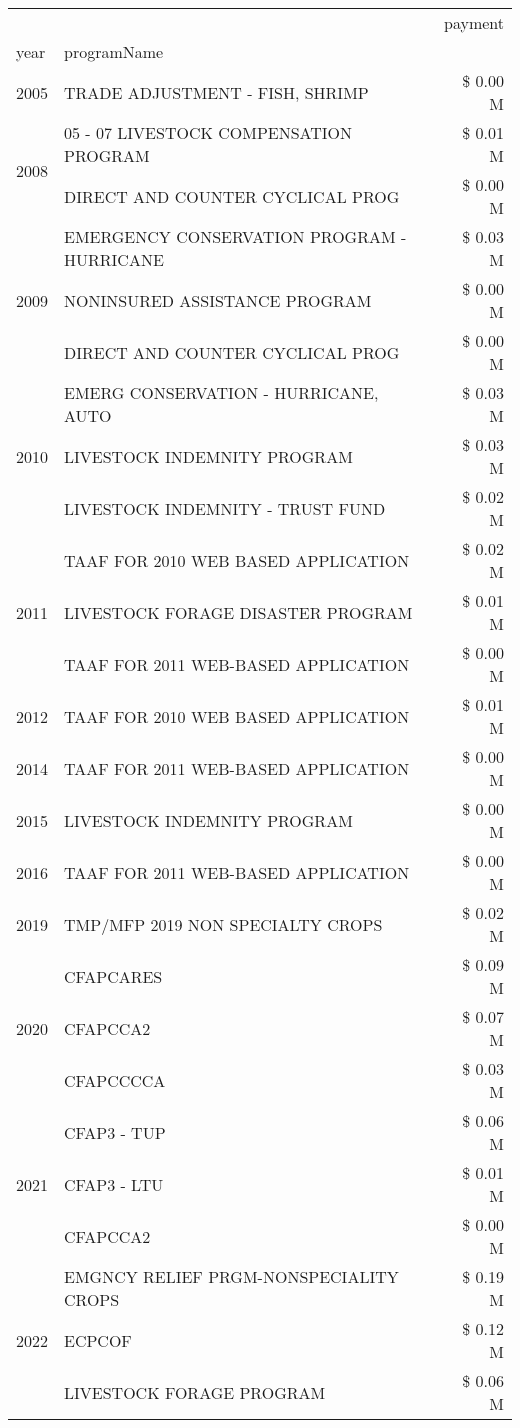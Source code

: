 \begin{tabular}{llr}
\toprule
 &  & payment \\
year & programName &  \\
\midrule
2005 & TRADE ADJUSTMENT - FISH, SHRIMP & \$ 0.00 M \\
\cline{1-3}
\multirow[t]{2}{*}{2008} & 05 - 07 LIVESTOCK COMPENSATION PROGRAM & \$ 0.01 M \\
 & DIRECT AND COUNTER CYCLICAL PROG & \$ 0.00 M \\
\cline{1-3}
\multirow[t]{3}{*}{2009} & EMERGENCY CONSERVATION PROGRAM - HURRICANE & \$ 0.03 M \\
 & NONINSURED ASSISTANCE PROGRAM & \$ 0.00 M \\
 & DIRECT AND COUNTER CYCLICAL PROG & \$ 0.00 M \\
\cline{1-3}
\multirow[t]{3}{*}{2010} & EMERG CONSERVATION - HURRICANE, AUTO & \$ 0.03 M \\
 & LIVESTOCK INDEMNITY PROGRAM & \$ 0.03 M \\
 & LIVESTOCK INDEMNITY - TRUST FUND & \$ 0.02 M \\
\cline{1-3}
\multirow[t]{3}{*}{2011} & TAAF FOR 2010 WEB BASED APPLICATION & \$ 0.02 M \\
 & LIVESTOCK FORAGE DISASTER PROGRAM & \$ 0.01 M \\
 & TAAF FOR 2011 WEB-BASED APPLICATION & \$ 0.00 M \\
\cline{1-3}
2012 & TAAF FOR 2010 WEB BASED APPLICATION & \$ 0.01 M \\
\cline{1-3}
2014 & TAAF FOR 2011 WEB-BASED APPLICATION & \$ 0.00 M \\
\cline{1-3}
2015 & LIVESTOCK INDEMNITY PROGRAM & \$ 0.00 M \\
\cline{1-3}
2016 & TAAF FOR 2011 WEB-BASED APPLICATION & \$ 0.00 M \\
\cline{1-3}
2019 & TMP/MFP 2019 NON SPECIALTY CROPS & \$ 0.02 M \\
\cline{1-3}
\multirow[t]{3}{*}{2020} & CFAPCARES & \$ 0.09 M \\
 & CFAPCCA2 & \$ 0.07 M \\
 & CFAPCCCCA & \$ 0.03 M \\
\cline{1-3}
\multirow[t]{3}{*}{2021} & CFAP3 - TUP & \$ 0.06 M \\
 & CFAP3 - LTU & \$ 0.01 M \\
 & CFAPCCA2 & \$ 0.00 M \\
\cline{1-3}
\multirow[t]{3}{*}{2022} & EMGNCY RELIEF PRGM-NONSPECIALITY CROPS & \$ 0.19 M \\
 & ECPCOF & \$ 0.12 M \\
 & LIVESTOCK FORAGE PROGRAM & \$ 0.06 M \\
\cline{1-3}
\bottomrule
\end{tabular}
